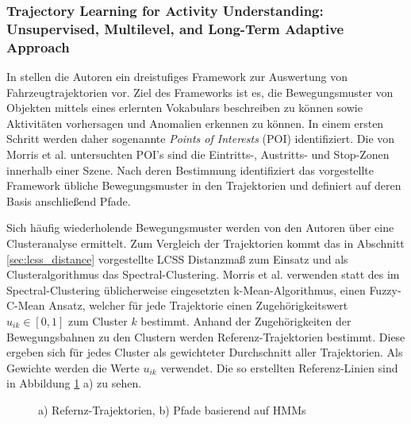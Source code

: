 \subsubsection*{Trajectory Learning for Activity Understanding: Unsupervised, Multilevel, and Long-Term Adaptive Approach}

In \cite[]{Morris2011} stellen die Autoren ein dreistufiges Framework zur Auswertung von Fahrzeugtrajektorien vor.
Ziel des Frameworks ist es, die Bewegungsmuster von Objekten mittels eines erlernten Vokabulars beschreiben zu können
sowie Aktivitäten vorhersagen und Anomalien erkennen zu können.
In einem ersten Schritt werden daher sogenannte \textit{Points of Interests} (POI) identifiziert. Die von Morris
et al. untersuchten POI's sind die Eintritts-, Austritts- und Stop-Zonen innerhalb einer Szene.
Nach deren Bestimmung identifiziert das vorgestellte Framework übliche Bewegungsmuster in den Trajektorien
und definiert auf deren Basis anschließend Pfade.

Sich häufig wiederholende Bewegungsmuster werden von den Autoren über eine Clusteranalyse ermittelt.
Zum Vergleich der Trajektorien kommt das in Abschnitt \ref{sec:lcss_distance} vorgestellte LCSS Distanzmaß zum Einsatz
und als Clusteralgorithmus das Spectral-Clustering. Morris et al. verwenden statt des im Spectral-Clustering
üblicherweise eingesetzten k-Mean-Algorithmus, einen Fuzzy-C-Mean Ansatz, welcher für jede Trajektorie
einen Zugehörigkeitswert $u_{ik} \in [0, 1]$ zum Cluster $k$ bestimmt.
Anhand der Zugehörigkeiten der Bewegungsbahnen zu den Clustern werden Referenz-Trajektorien bestimmt.
Diese ergeben sich für jedes Cluster als gewichteter Durchschnitt aller Trajektorien. Als Gewichte
werden die Werte $u_{ik}$ verwendet. Die so erstellten Referenz-Linien sind in Abbildung
\ref{fig:relw_morris_results} a) zu sehen.

\begin{figure}[H]
    \centering
    \qquad
    \caption[Referenz-Trajektorien und Pfade (Morris et al.)]{a) Refernz-Trajektorien, b) Pfade basierend auf HMMs \cite[]{Morris2011}}
    \label{fig:relw_morris_results}
\end{figure}

